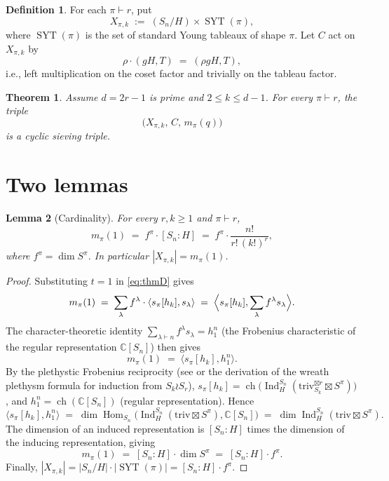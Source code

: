 \documentclass[11pt]{article}
\newtheorem{theorem}{Theorem}
\newtheorem{lemma}[theorem]{Lemma}
\theoremstyle{definition}
\newtheorem*{definition*}{Definition}
\theoremstyle{remark}
\newcommand{\Ind}{\operatorname{Ind}}
\newcommand{\Hom}{\operatorname{Hom}}
\newcommand{\ch}{\operatorname{ch}}
\newcommand{\triv}{\mathrm{triv}}
\newcommand{\SYT}{\operatorname{SYT}}
\newcommand{\CC}{\mathbb{C}}
\begin{document}
\begin{definition*}
For each $\pi \vdash r$, put
\[
X_{\pi,k} \;:=\; (S_n / H) \times \SYT(\pi),
\]
where $\SYT(\pi)$ is the set of standard Young tableaux of shape $\pi$.  Let $C$ act on $X_{\pi,k}$ by
\[
\rho \cdot (gH, T) \;=\; (\rho g H, T),
\]
i.e., left multiplication on the coset factor and trivially on the tableau factor.
\end{definition*}

\begin{theorem}\label{thm:main}
Assume $d = 2r - 1$ is prime and $2 \le k \le d - 1$.  For every $\pi \vdash r$, the triple
\[
\bigl( X_{\pi,k}, \, C, \, m_\pi(q) \bigr)
\]
is a cyclic sieving triple.
\end{theorem}

\section{Two lemmas}

\begin{lemma}[Cardinality]\label{lem:count}
For every $r, k \ge 1$ and $\pi \vdash r$,
\[
m_\pi(1) \;=\; f^\pi \cdot [S_n : H] \;=\; f^\pi \cdot \frac{n!}{r!\,(k!)^r},
\]
where $f^\pi = \dim S^\pi$.  In particular $|X_{\pi,k}| = m_\pi(1)$.
\end{lemma}

\begin{proof}
Substituting $t = 1$ in \eqref{eq:thmD} gives
\[
m_\pi(1) \;=\; \sum_\lambda f^\lambda \cdot \langle s_\pi[h_k], s_\lambda\rangle \;=\; \Bigl\langle s_\pi[h_k], \sum_\lambda f^\lambda s_\lambda\Bigr\rangle.
\]
The character-theoretic identity $\sum_{\lambda \vdash n} f^\lambda s_\lambda = h_1^n$ (the Frobenius characteristic of the regular representation $\CC[S_n]$) then gives
\[
m_\pi(1) \;=\; \langle s_\pi[h_k], h_1^n\rangle.
\]
By the plethystic Frobenius reciprocity (see \cite[I.8]{Macdonald} or the derivation of the wreath plethysm formula for induction from $S_k \wr S_r$), $s_\pi[h_k] = \ch\bigl( \Ind_H^{S_n}(\triv_{S_k}^{\boxtimes r} \boxtimes S^\pi)\bigr)$, and $h_1^n = \ch(\CC[S_n])$ (regular representation).  Hence
\[
\langle s_\pi[h_k], h_1^n\rangle \;=\; \dim \Hom_{S_n}\!\bigl( \Ind_H^{S_n}(\triv \boxtimes S^\pi), \CC[S_n]\bigr) \;=\; \dim \Ind_H^{S_n}(\triv \boxtimes S^\pi).
\]
The dimension of an induced representation is $[S_n : H]$ times the dimension of the inducing representation, giving
\[
m_\pi(1) \;=\; [S_n : H] \cdot \dim S^\pi \;=\; [S_n : H] \cdot f^\pi.
\]
Finally, $|X_{\pi,k}| = |S_n/H| \cdot |\SYT(\pi)| = [S_n : H] \cdot f^\pi$.
\end{proof}
\end{document}
